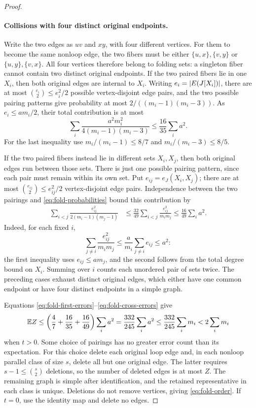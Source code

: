 \begin{proof}
\paragraph{Collisions with four distinct original endpoints.}
Write the two edges as $uv$ and $xy$, with four different vertices.
For them to become the same nonloop edge, the two fibers must be either
$\{u,x\},\{v,y\}$ or $\{u,y\},\{v,x\}$.  All four vertices therefore
belong to folding sets: a singleton fiber cannot contain two distinct
original endpoints.  If the two paired fibers lie in one $X_i$, then both
original edges are internal to $X_i$.  Writing $e_i=\left|E(J[X_i])\right|$,
there are at most $\binom{e_i}2\le e_i^2/2$ possible vertex-disjoint edge
pairs, and the two possible
pairing patterns give probability at most
$2/((m_i-1)(m_i-3))$.  As $e_i\le a m_i/2$, their total contribution is
at most
\begin{equation}\label{eq:fold-internal-errors}
 \sum_i\frac{a^2m_i^2}{4(m_i-1)(m_i-3)}
 \le\frac{16}{35}\sum_i a^2.
\end{equation}
For the last inequality use $m_i/(m_i-1)\le8/7$ and
$m_i/(m_i-3)\le8/5$.

If the two paired fibers instead lie in different sets $X_i,X_j$, then
both original edges run between those sets.  There is just one possible
pairing pattern, since each pair must remain within its own set.  Put
$e_{ij}=e_J(X_i,X_j)$; there are at most $\binom{e_{ij}}2\le e_{ij}^2/2$
vertex-disjoint edge pairs.  Independence between the two pairings and
\eqref{eq:fold-probabilities} bound this contribution by
\begin{align}
 \sum_{i<j}\frac{e_{ij}^2}{2(m_i-1)(m_j-1)}
 &\le\frac{32}{49}\sum_{i<j}\frac{e_{ij}^2}{m_i m_j}
 \le\frac{16}{49}\sum_i a^2.\label{eq:fold-cross-errors}
\end{align}
Indeed, for each fixed $i$,
\[
 \sum_{j\ne i}\frac{e_{ij}^2}{m_i m_j}
 \le\frac a{m_i}\sum_{j\ne i}e_{ij}\le a^2:
\]
the first inequality uses $e_{ij}\le a m_j$, and the second follows from
the total degree bound on $X_i$.  Summing over $i$ counts each unordered
pair of sets twice.  The preceding cases exhaust distinct original
edges, which either have one common endpoint or have four distinct
endpoints in a simple graph.

Equations \eqref{eq:fold-first-errors}--\eqref{eq:fold-cross-errors} give
\[
 \mathbb E Z\le
 \left(\frac47+\frac{16}{35}+\frac{16}{49}\right)\sum_i a^2
 =\frac{332}{245}\sum_i a^2
 \le\frac{332}{245}\sum_i m_i<2\sum_i m_i
\]
when $t>0$.  Some choice of pairings has no greater error count than its
expectation.  For this choice delete each original loop edge and, in each
nonloop parallel class of size $s$, delete all but one original edge.
The latter requires $s-1\le\binom s2$ deletions, so the number of deleted
edges is at most $Z$.  The remaining graph is simple after identification,
and the retained representative in each class is unique.  Deletions do
not remove vertices, giving \eqref{eq:fold-order}.  If $t=0$, use the
identity map and delete no edges.
\end{proof}

